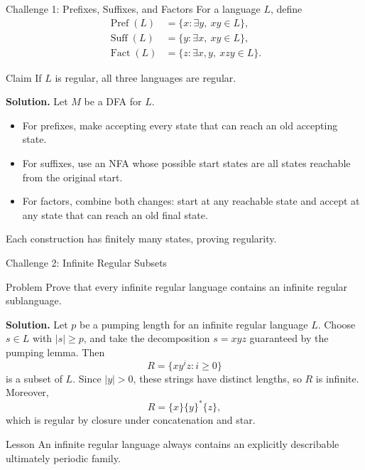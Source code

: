 \documentclass[10pt]{beamer}
\begin{document}
\begin{frame}{Challenge 1: Prefixes, Suffixes, and Factors}
  \small
  For a language $L$, define
  \[
    \begin{aligned}
      \operatorname{Pref}(L)&=\{x:\exists y,\ xy\in L\},\\
      \operatorname{Suff}(L)&=\{y:\exists x,\ xy\in L\},\\
      \operatorname{Fact}(L)&=\{z:\exists x,y,\ xzy\in L\}.
    \end{aligned}
  \]
  \begin{block}{Claim}
    If $L$ is regular, all three languages are regular.
  \end{block}
  \textbf{Solution.}
  Let $M$ be a DFA for $L$.
  \begin{itemize}
    \item For prefixes, make accepting every state that can reach an old
      accepting state.
    \item For suffixes, use an NFA whose possible start states are all states
      reachable from the original start.
    \item For factors, combine both changes: start at any reachable state and
      accept at any state that can reach an old final state.
  \end{itemize}
  Each construction has finitely many states, proving regularity.
\end{frame}

\begin{frame}{Challenge 2: Infinite Regular Subsets}
  \small
  \begin{block}{Problem}
    Prove that every infinite regular language contains an infinite regular
    sublanguage.
  \end{block}
  \textbf{Solution.}
  Let $p$ be a pumping length for an infinite regular language $L$.
  Choose $s\in L$ with $|s|\ge p$, and take the decomposition
  $s=xyz$ guaranteed by the pumping lemma. Then
  \[
    R=\{xy^iz:i\ge0\}
  \]
  is a subset of $L$. Since $|y|>0$, these strings have distinct lengths, so
  $R$ is infinite. Moreover,
  \[
    R=\{x\}\{y\}^*\{z\},
  \]
  which is regular by closure under concatenation and star.
  \begin{exampleblock}{Lesson}
    An infinite regular language always contains an explicitly describable
    ultimately periodic family.
  \end{exampleblock}
\end{frame}
\end{document}
